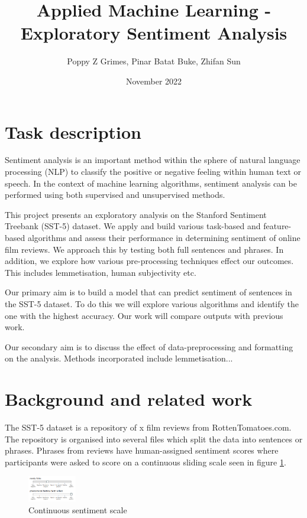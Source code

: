 \documentclass[10pt, a4paper]{article}
\title{Applied Machine Learning - Exploratory Sentiment Analysis}
\author{Poppy Z Grimes, Pinar Batat Buke, Zhifan Sun}
\date{November 2022}
\begin{document}
\maketitle 

\section{Task description}

Sentiment analysis is an important method within the sphere of natural language processing (NLP) to classify the positive or negative feeling within human text or speech. In the context of machine learning algorithms, sentiment analysis can be performed using both supervised and unsupervised methods. 

This project presents an exploratory analysis on the Stanford Sentiment Treebank (SST-5) dataset. We apply and build various task-based and feature-based algorithms and assess their performance in determining sentiment of online film reviews. We approach this by testing both full sentences and phrases. In addition, we explore how various pre-processing techniques effect our outcomes. This includes lemmetisation, human subjectivity etc. %

Our primary aim is to build a model that can predict sentiment of sentences in the SST-5 dataset. To do this we will explore various algorithms and identify the one with the highest accuracy. Our work will compare outputs with previous work.

Our secondary aim is to discuss the effect of data-preprocessing and formatting on the analysis. Methods incorporated include lemmetisation...


\section{Background and related work}
The SST-5 dataset is a repository of x %
film reviews from RottenTomatoes.com. The repository is organised into several files which split the data into sentences or phrases. Phrases from reviews have human-assigned sentiment scores where participants were asked to score on a continuous sliding scale seen in figure \ref{fig:sentiment_scale}.

\begin{figure}
    \begin{center}
        \includegraphics[width=0.189\textwidth]{sentiment_scale} 
    \end{center}
\caption{Continuous sentiment scale}
\label{fig:sentiment_scale}
\end{figure}
\end{document}

